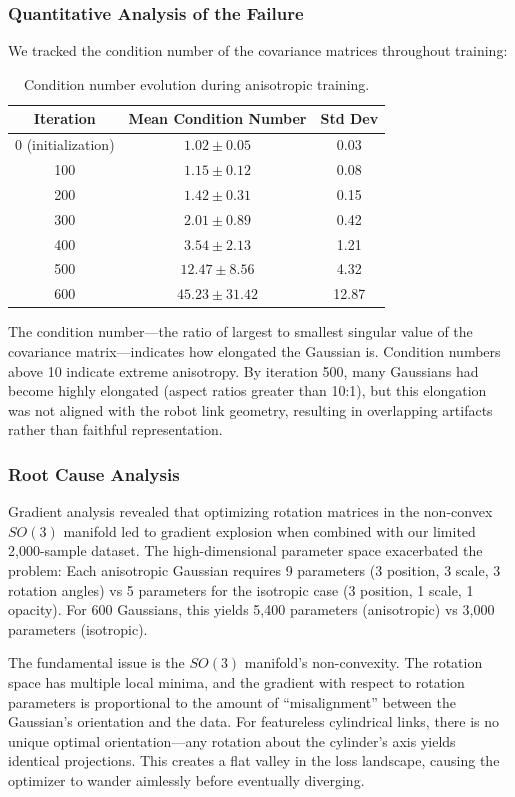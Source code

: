 \documentclass[12pt,a4paper,oneside]{report}
\begin{document}
\subsubsection{Quantitative Analysis of the Failure}
We tracked the condition number of the covariance matrices throughout training:
\begin{table}[H]
\centering
\caption{Condition number evolution during anisotropic training.}
\label{tab:condition_number}
\begin{tabular}{ccc}
\toprule
Iteration & Mean Condition Number & Std Dev \\
\midrule
0 (initialization) & $1.02 \pm 0.05$ & 0.03 \\
100 & $1.15 \pm 0.12$ & 0.08 \\
200 & $1.42 \pm 0.31$ & 0.15 \\
300 & $2.01 \pm 0.89$ & 0.42 \\
400 & $3.54 \pm 2.13$ & 1.21 \\
500 & $12.47 \pm 8.56$ & 4.32 \\
600 & $45.23 \pm 31.42$ & 12.87 \\
\bottomrule
\end{tabular}
\end{table}

The condition number---the ratio of largest to smallest singular value of the covariance matrix---indicates how elongated the Gaussian is. Condition numbers above 10 indicate extreme anisotropy. By iteration 500, many Gaussians had become highly elongated (aspect ratios greater than 10:1), but this elongation was not aligned with the robot link geometry, resulting in overlapping artifacts rather than faithful representation.

\subsubsection{Root Cause Analysis}
Gradient analysis revealed that optimizing rotation matrices in the non-convex $SO(3)$ manifold led to gradient explosion when combined with our limited 2,000-sample dataset. The high-dimensional parameter space exacerbated the problem: Each anisotropic Gaussian requires 9 parameters (3 position, 3 scale, 3 rotation angles) vs 5 parameters for the isotropic case (3 position, 1 scale, 1 opacity). For 600 Gaussians, this yields 5,400 parameters (anisotropic) vs 3,000 parameters (isotropic).

The fundamental issue is the $SO(3)$ manifold's non-convexity. The rotation space has multiple local minima, and the gradient with respect to rotation parameters is proportional to the amount of ``misalignment'' between the Gaussian's orientation and the data. For featureless cylindrical links, there is no unique optimal orientation---any rotation about the cylinder's axis yields identical projections. This creates a flat valley in the loss landscape, causing the optimizer to wander aimlessly before eventually diverging.
\end{document}
